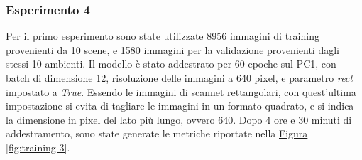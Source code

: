 \documentclass[12pt]{report}
\begin{document}
\subsubsection{Esperimento 4}
\label{sec:esperimento_4}

Per il primo esperimento sono state utilizzate 8956 immagini di training provenienti da 10 scene, e 1580 immagini per la validazione provenienti dagli stessi 10 ambienti. Il modello è stato addestrato per 60 epoche sul PC1, con batch di dimensione 12, risoluzione delle immagini a 640 pixel, e parametro \textit{rect} impostato a \textit{True}. Essendo le immagini di scannet rettangolari, con quest'ultima impostazione si evita di tagliare le immagini in un formato quadrato, e si indica la dimensione in pixel del lato più lungo, ovvero 640. Dopo 4 ore e 30 minuti di addestramento, sono state generate le metriche riportate nella \hyperref[fig:training-3]{Figura \ref{fig:training-3}}.
\end{document}
